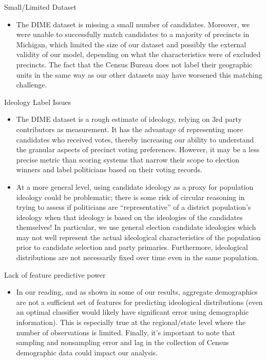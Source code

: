 \documentclass{article}
\begin{document}
\begin{itemize}
Small/Limited Dataset
\begin{itemize}
    \item The DIME dataset is missing a small number of candidates. Moreover, we were unable to successfully match candidates to a majority of precincts in Michigan, which limited the size of our dataset and possibly the external validity of our model, depending on what the characteristics were of excluded precincts. The fact that the Census Bureau does not label their geographic units in the same way as our other datasets may have worsened this matching challenge.
\end{itemize}
Ideology Label Issues
\begin{itemize}
    \item The DIME dataset is a rough estimate of ideology, relying on 3rd party contributors as measurement. It has the advantage of representing more candidates who received votes, thereby increasing our ability to understand the granular aspects of precinct voting preferences. However, it may be a less precise metric than scoring systems that narrow their scope to election winners and label politicians based on their voting records.
    \item At a more general level, using candidate ideology as a proxy for population ideology could be problematic; there is some risk of circular reasoning in trying to assess if politicians are “representative” of a district population’s ideology when that ideology is based on the ideologies of the candidates themselves! In particular, we use general election candidate ideologies which may not well represent the actual ideological characteristics of the population prior to candidate selection and party primaries. Furthermore, ideological distributions are not necessarily fixed over time even in the same population.
\end{itemize}
Lack of feature predictive power
\begin{itemize}
    \item In our reading, and as shown in some of our results, aggregate demographics are not a sufficient set of features for predicting ideological distributions (even an optimal classifier would likely have significant error using demographic information). This is especially true at the regional/state level where the number of observations is limited. Finally, it’s important to note that sampling and nonsampling error and lag in the collection of Census demographic data could impact our analysis.
\end{itemize}



\end{itemize}
\end{document}
